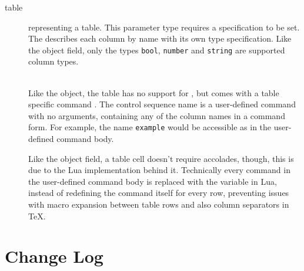 \documentclass{ltxdoc}
\newcommand\showexample[5][15pt]{%
\begin{minipage}[t]{.5\linewidth - .5 \columnsep}%

\end{minipage}\hspace*{\columnsep}%
\begin{minipage}[t]{.5\linewidth - .5 \columnsep}%

\end{minipage}\\%
}
\begin{document}
\begin{description}
        \item[table] representing a table.
        This parameter type requires a  specification to be set.
        The  describes each column by name with its own type specification.
        Like the object field, only the types \texttt{bool}, \texttt{number} and \texttt{string} are supported column types.\\
        \showexample[20pt]{28}{28-36}{11}{11-15}
        \DescribeMacro{\fortablerow}
        Like the object, the table has no support for \cmd{\param}, but comes with a table specific command \cmd{\fortablerow}.
        The control sequence name  is a user-defined command with no arguments, containing any of the column names in a command form.
        For example, the name \texttt{example} would be accessible as \cmd{\example} in the user-defined command body.

        Like the object field, a table cell doesn't require accolades, though, this is due to the Lua implementation behind it.
        Technically every command in the user-defined command body is replaced with the variable in Lua, instead of redefining the command itself for every row, preventing issues with macro expansion between table rows and also column separators in \TeX{}.

    \end{description}

    \clearpage

    \printbibliography[heading=bibnumbered]

    \clearpage

    \section{Change Log}
    \newcommand\commitline[3]{\item #1\ifx&#3&%
    \else\\[1em]
    #3\fi\\\hspace*{1em} — \printdate{#2}}
    \newcommand\formatversion[3]{%
        \item[#1]
        \gittag[(taggerdate)(taggerdate:short)(authordate:short)]{printdate}{#1}
        \begin{itemize}
            \forgitcommit[s,as,b]{commitline}{#3}
        \end{itemize}
    }%
    \begin{description}
    \end{description}
\end{document}
